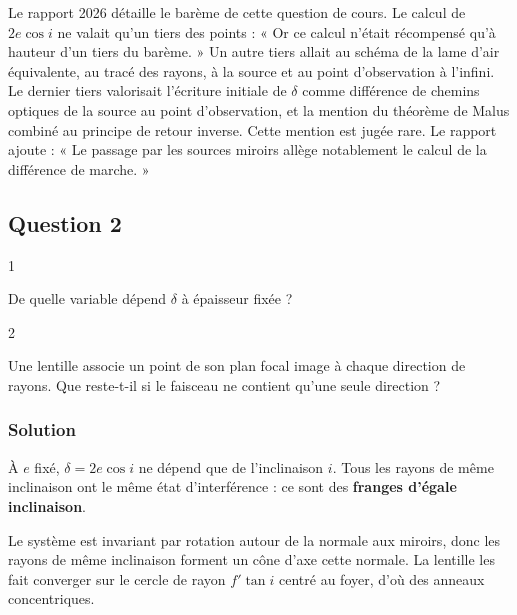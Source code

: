 \documentclass[11pt,a4paper]{article}
\begin{document}
\begin{jury}

Le rapport 2026 détaille le barème de cette question de cours. Le calcul de \(2e\cos i\) ne valait qu'un tiers des points : « Or ce calcul n'était récompensé qu'à hauteur d'un tiers du barème. » Un autre tiers allait au schéma de la lame d'air équivalente, au tracé des rayons, à la source et au point d'observation à l'infini. Le dernier tiers valorisait l'écriture initiale de \(\delta\) comme différence de chemins optiques de la source au point d'observation, et la mention du théorème de Malus combiné au principe de retour inverse. Cette mention est jugée rare. Le rapport ajoute : « Le passage par les sources miroirs allège notablement le calcul de la différence de marche. »

\end{jury}

\hypertarget{question-2}{%
\subsection{Question 2}\label{question-2}}

\begin{indication}{1}

De quelle variable dépend \(\delta\) à épaisseur fixée ?

\end{indication}

\begin{indication}{2}

Une lentille associe un point de son plan focal image à chaque direction de rayons. Que reste-t-il si le faisceau ne contient qu'une seule direction ?

\end{indication}

\hypertarget{solution-1}{%
\subsubsection{Solution}\label{solution-1}}

À \(e\) fixé, \(\delta=2e\cos i\) ne dépend que de l'inclinaison \(i\). Tous les rayons de même inclinaison ont le même état d'interférence : ce sont des \textbf{franges d'égale inclinaison}.

Le système est invariant par rotation autour de la normale aux miroirs, donc les rayons de même inclinaison forment un cône d'axe cette normale. La lentille les fait converger sur le cercle de rayon \(f'\tan i\) centré au foyer, d'où des anneaux concentriques.
\end{document}
